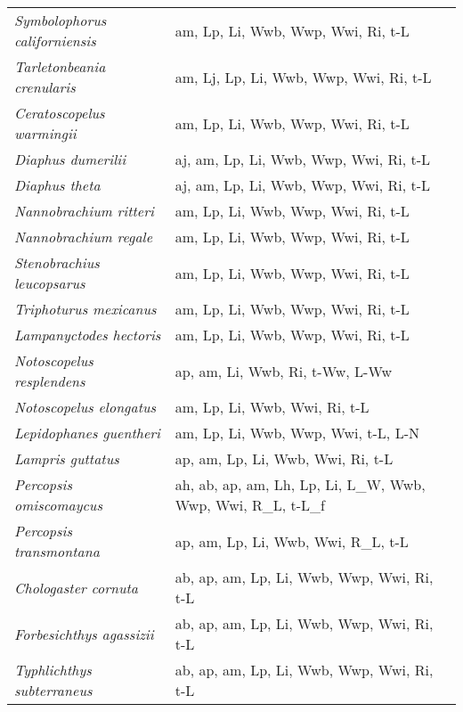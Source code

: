{\begin{longtable}[c]{p{3.5cm}p{5.5cm}p{5.5cm}}
\emph{Symbolophorus californiensis} &  am, Lp, Li, Wwb, Wwp, Wwi, Ri, t-L & \citet{TakaYats2006} \\
\emph{Tarletonbeania crenularis} &  am, Lj, Lp, Li, Wwb, Wwp, Wwi, Ri, t-L & \citet{BystPhil2010} \\
\emph{Ceratoscopelus warmingii} &  am, Lp, Li, Wwb, Wwp, Wwi, Ri, t-L & \citet{TakaYats2006} \\
\emph{Diaphus dumerilii} &  aj, am, Lp, Li, Wwb, Wwp, Wwi, Ri, t-L & \citet{Gart1991,Gart1993} \\
\emph{Diaphus theta} &  aj, am, Lp, Li, Wwb, Wwp, Wwi, Ri, t-L & \citet{MokuIshi2001} \\
\emph{Nannobrachium ritteri} &  am, Lp, Li, Wwb, Wwp, Wwi, Ri, t-L & \citet{ChilTayl1980} \\
\emph{Nannobrachium regale} &  am, Lp, Li, Wwb, Wwp, Wwi, Ri, t-L & \citet{ChilTayl1980} \\
\emph{Stenobrachius leucopsarus} &  am, Lp, Li, Wwb, Wwp, Wwi, Ri, t-L & \citet{ChilTayl1980} \\
\emph{Triphoturus mexicanus} &  am, Lp, Li, Wwb, Wwp, Wwi, Ri, t-L & \citet{ChilTayl1980} \\
\emph{Lampanyctodes hectoris} &  am, Lp, Li, Wwb, Wwp, Wwi, Ri, t-L & \citet{Pros1991,Robe1977,YounBulm1988} \\
\emph{Notoscopelus resplendens} &  ap, am, Li, Wwb, Ri, t-Ww, L-Ww & \citet{SarmTria2018} \\
\emph{Notoscopelus elongatus} &  am, Lp, Li, Wwb, Wwi, Ri, t-L & \citet{Gjos1981} \\
\emph{Lepidophanes guentheri} &  am, Lp, Li, Wwb, Wwp, Wwi, t-L, L-N & \citet{Gart1991,Gart1993} \\
\emph{Lampris guttatus} &  ap, am, Lp, Li, Wwb, Wwi, Ri, t-L & \citet{FranGrig2004,Cole2010} \\
\emph{Percopsis omiscomaycus} &  ah, ab, ap, am, Lh, Lp, Li, L\_W, Wwb, Wwp, Wwi, R\_L, t-L\_f & \citet{Kooy2014,Spaff1999,HousWell1973} \\
\emph{Percopsis transmontana} &  ap, am, Lp, Li, Wwb, Wwi, R\_L, t-L & \citet{GrayDaub1979} \\
\emph{Chologaster cornuta} &  ab, ap, am, Lp, Li, Wwb, Wwp, Wwi, Ri, t-L & \citet{Poul1963} \\
\emph{Forbesichthys agassizii} &  ab, ap, am, Lp, Li, Wwb, Wwp, Wwi, Ri, t-L & \citet{Poul1963} \\
\emph{Typhlichthys subterraneus} &  ab, ap, am, Lp, Li, Wwb, Wwp, Wwi, Ri, t-L & \citet{Poul1963} \\

\end{longtable}}
